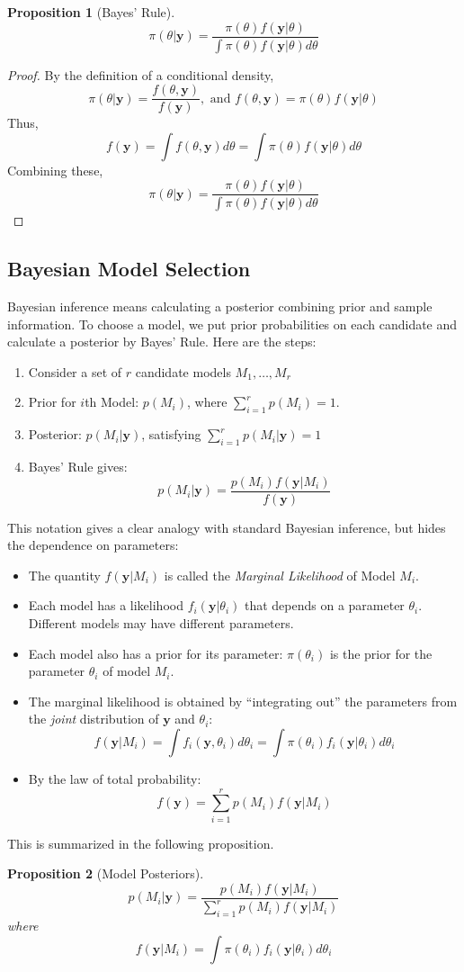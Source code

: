 \documentclass[12pt]{article}
\newtheorem{pro}{Proposition}[section]
\theoremstyle{definition}
\begin{document}
\begin{pro}[Bayes' Rule]
	$$\pi(\theta|\mathbf{y}) = \frac{\pi(\theta)f(\mathbf{y}|\theta)}{\int \pi(\theta)f(\mathbf{y}|\theta) d\theta }$$
\end{pro}	
\begin{proof}
By the definition of a conditional density,
	$$\pi(\theta|\mathbf{y}) = \frac{f(\theta, \mathbf{y})}{f(\mathbf{y})}, \mbox{ and } f(\theta, \mathbf{y}) = \pi(\theta)f(\mathbf{y}|\theta)$$
Thus, 
	$$f(\mathbf{y}) = \int f(\theta,\mathbf{y})d\theta = \int \pi(\theta)f(\mathbf{y}|\theta) d\theta $$
Combining these,
	$$\pi(\theta|\mathbf{y}) = \frac{\pi(\theta)f(\mathbf{y}|\theta)}{\int \pi(\theta)f(\mathbf{y}|\theta) d\theta }$$
\end{proof}

\subsection{Bayesian Model Selection}
Bayesian inference means calculating a posterior combining prior and sample information. To choose a model, we put prior probabilities on each candidate and calculate a posterior by Bayes' Rule. Here are the steps:
	\begin{enumerate}
		\item Consider a set of $r$ candidate models $M_1, \hdots, M_r$
		\item Prior for $i$th Model: $p(M_i)$, where $\sum_{i=1}^r p(M_i) = 1$. 
		\item Posterior: $p(M_i|\mathbf{y})$, satisfying $\sum_{i=1}^r p(M_i|\mathbf{y}) = 1$ 
		\item Bayes' Rule gives:
			$$p(M_i|\mathbf{y}) = \frac{p(M_i)f(\mathbf{y}|M_i)}{f(\mathbf{y})}$$
	\end{enumerate}
This notation gives a clear analogy with standard Bayesian inference, but hides the dependence on parameters:
	\begin{itemize}
		\item The quantity $f(\mathbf{y}|M_i)$ is called the \emph{Marginal Likelihood} of Model $M_i$. 
		\item Each model has a likelihood $f_i(\mathbf{y}|\theta_i)$ that depends on a parameter $\theta_i$. Different models may have different parameters.
		\item Each model also has a prior for its parameter: $\pi(\theta_i)$ is the prior for the parameter $\theta_i$ of model $M_i$.
		\item The marginal likelihood is obtained by ``integrating out'' the parameters from the \emph{joint} distribution of $\mathbf{y}$ and $\theta_i$:
			$$f(\mathbf{y}|M_i) = \int f_i(\mathbf{y},\theta_i)d\theta_i = \int \pi(\theta_i)f_i(\mathbf{y}|\theta_i)d\theta_i$$
		\item By the law of total probability:
			$$f(\mathbf{y}) = \sum_{i=1}^r p(M_i) f(\mathbf{y}|M_i)$$
		\end{itemize}
This is summarized in the following proposition.
\begin{pro}[Model Posteriors]
			$$p(M_i|\mathbf{y}) = \frac{p(M_i)f(\mathbf{y}|M_i)}{\sum_{i=1}^r p(M_i) f(\mathbf{y}|M_i)}$$
			where
			$$f(\mathbf{y}|M_i) = \int \pi(\theta_i)f_i(\mathbf{y}|\theta_i)d\theta_i$$
\end{pro}
\end{document}
